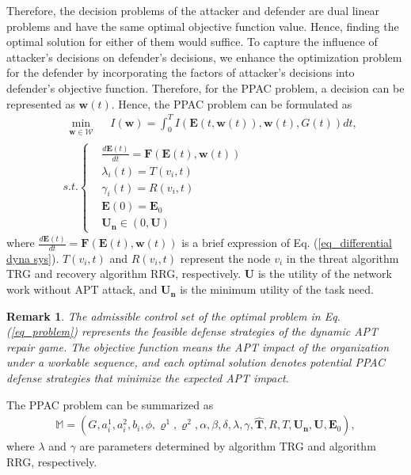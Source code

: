 \documentclass[lettersize,journal]{IEEEtran}
\newtheorem{remark}{ \textbf{Remark}}
\begin{document}
\par
Therefore, the decision problems of the attacker and defender are dual linear problems and have the same optimal objective function value. Hence, finding the optimal solution for either of them would suffice. To capture the influence of attacker's decisions on defender's decisions, we enhance the optimization problem for the defender by incorporating the factors of attacker's decisions into defender's objective function. Therefore, for the PPAC problem, a decision can be represented as $\bm{w}(t)$. Hence, the PPAC problem can be formulated as  
\begin{equation}\label{eq_problem}
\begin{aligned}
&\min_{\substack{\bm{w}\in\mathcal{W}}}\quad I(\bm{w}) =\int_0^TI(\bm{E}(t,\bm{w}(t)),\bm{w}(t),G(t))dt,\\
&s.t. 
 \begin{cases}
     &\frac{d\bm{E}(t)}{dt}=\bm{F}(\bm{E}(t),\bm{w}(t))  \\
     &\lambda_i(t)=T(v_i,t) \\
     &\gamma_i(t)=R(v_i,t)\\
     &\bm{E}(0)=\bm{E}_0 \\
     &\bm{U_n}\in(0,\bm{U})
 \end{cases}
   \end{aligned}
\end{equation}
 where $\frac{d\bm{E}(t)}{dt}=\bm{F}(\bm{E}(t),\bm{w}(t))$ is a brief expression of Eq. (\ref{eq_differential dyna sys}). $T(v_i,t)$ and $R(v_i,t)$ represent the node $v_i$ in the threat algorithm TRG and recovery algorithm RRG, respectively. $\bm{U}$ is the utility of the network work without APT attack, and $\bm{U_n}$ is the minimum utility of the task need.\par
\begin{remark}
The admissible control set of the optimal problem in Eq. (\ref{eq_problem}) represents the feasible defense strategies of the dynamic APT repair game. The objective function means the APT impact of the organization under a workable sequence, and each optimal solution denotes potential PPAC defense strategies that minimize the expected APT impact. 
\end{remark}
\par
The PPAC problem can be summarized as 
\begin{equation}\label{eq_PPAC}
\begin{aligned}
\mathbb{M}=(G,a^1_i,a^2_i,b_i,\phi,\varrho^1,\varrho^2,\alpha,\beta,\delta,\lambda,\gamma,\bm{\hat{T}},R,T,\bm{U_n},\bm{U},\bm{E}_0),
   \end{aligned}
\end{equation}
where $\lambda$ and $\gamma$ are parameters determined by algorithm TRG and algorithm RRG, respectively.
\end{document}
